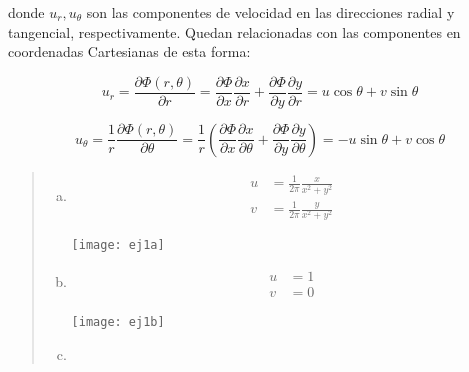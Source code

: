 \documentclass[a4paper,10pt,twoside,final,spanish]{article}
\begin{document}
donde $u_{r},u_{\theta}$ son las componentes de velocidad en las direcciones radial y tangencial, respectivamente. Quedan relacionadas con las componentes en coordenadas Cartesianas de esta forma:

\[
u_{r}=\frac{\partial\Phi(r,\theta)}{\partial r}
=\frac{\partial\Phi}{\partial x}\frac{\partial x}{\partial r}
+\frac{\partial\Phi}{\partial y}\frac{\partial y}{\partial r}
=u\cos\theta+v\sin\theta
\]

\[
u_{\theta}=\frac{1}{r}\frac{\partial\Phi(r,\theta)}{\partial\theta}
=\frac{1}{r}\left(
\frac{\partial\Phi}{\partial x}\frac{\partial x}{\partial\theta}
+\frac{\partial\Phi}{\partial y}\frac{\partial y}{\partial\theta}
\right)
=-u\sin\theta+v\cos\theta
\]

\dotfill

\begin{quote}
\begin{enumerate}[a)]

\item

\begin{minipage}{0.5\linewidth}

\begin{align*}
u &= \frac{1}{2\pi}\frac{x}{x^{2}+y^{2}} \\
v &= \frac{1}{2\pi}\frac{y}{x^{2}+y^{2}}
\end{align*}

\end{minipage} \hfill \begin{minipage}{0.5\linewidth}

\texttt{[image: ej1a]}

\end{minipage}

\item

\begin{minipage}{0.5\linewidth}

\begin{align*}
u &= 1 \\
v &= 0
\end{align*}

\end{minipage} \hfill \begin{minipage}{0.5\linewidth}

\texttt{[image: ej1b]}

\end{minipage}

\item


\end{enumerate}
\end{quote}
\end{document}

